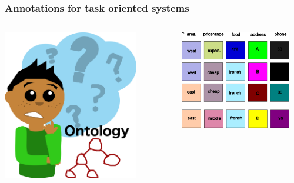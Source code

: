 \documentclass[10pt, compress,british,xcolor={svgnames,dvipsnames,x11names},trans]{beamer}
\begin{document}
\begin{frame}\frametitle{Annotations for task oriented systems}
    \begin{columns}
        \begin{column}{0.40\textwidth}
            \includegraphics[width=0.80\textwidth]{is_it_ontology.png}
        \end{column}
        \begin{column}{0.60\textwidth}
            \vfill
            \includegraphics[width=0.90\textwidth]{db_columns.png}
        \end{column}
    \end{columns}
\end{frame}
\end{document}
